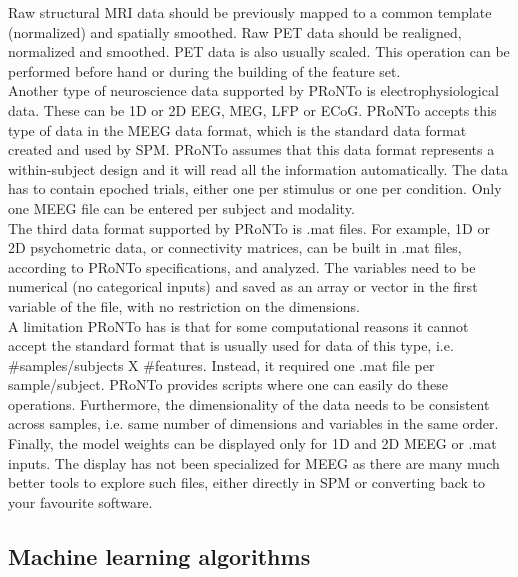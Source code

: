 Raw structural MRI data should be previously mapped to a common template (normalized) and spatially smoothed. Raw PET data should be realigned, normalized and smoothed. PET data is also usually scaled. This operation can be performed before hand or during the building of the feature set.
\\

Another type of neuroscience data supported by PRoNTo is electrophysiological data. These can be 1D or 2D EEG, MEG, LFP or ECoG. PRoNTo accepts this type of data in the MEEG data format, which is the standard data format created and used by SPM. PRoNTo assumes that this data format represents a within-subject design and it will read all the information automatically. The data has to contain epoched trials, either one per stimulus or one per condition. Only one MEEG file can be entered per subject and modality.
\\

The third data format supported by PRoNTo is .mat files. For example, 1D or 2D psychometric data, or connectivity matrices, can be built in .mat files, according to PRoNTo specifications, and analyzed. The variables need to be numerical (no categorical inputs) and saved as an array or vector in the first variable of the file, with no restriction on the dimensions.
\\

A limitation PRoNTo has is that for some computational reasons it cannot accept the standard format that is usually used for data of this type, i.e. \#samples/subjects X \#features. Instead, it required one .mat file per sample/subject. PRoNTo provides scripts where one can easily do these operations. Furthermore, the dimensionality of the data needs to be consistent across samples, i.e. same number of dimensions and variables in the same order.
\\

Finally, the model weights can be displayed only for 1D and 2D MEEG or .mat inputs. The display has not been specialized for MEEG as there are many much better tools to explore such files, either directly in SPM or converting back to your favourite software.

\subsection{Machine learning algorithms}

